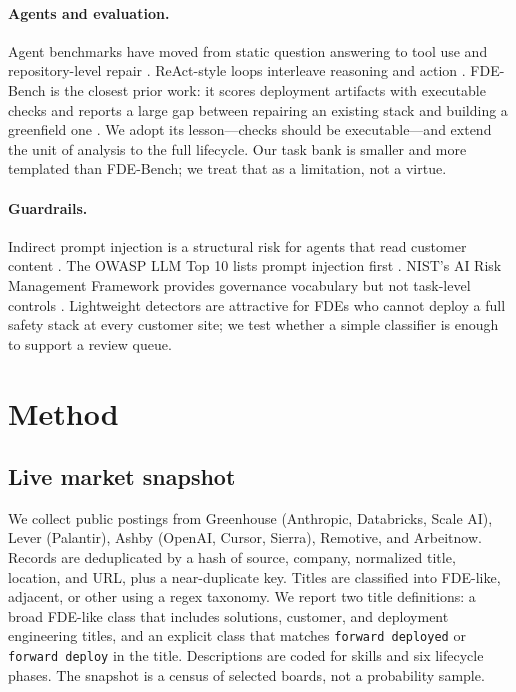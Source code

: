 \documentclass[11pt]{article}
\begin{document}
\paragraph{Agents and evaluation.} Agent benchmarks have moved from static question answering to tool use and repository-level repair \citep{liu2024agentbench,jimenez2024swebench}. ReAct-style loops interleave reasoning and action \citep{yao2023react}. FDE-Bench is the closest prior work: it scores deployment artifacts with executable checks and reports a large gap between repairing an existing stack and building a greenfield one \citep{fdebench2026}. We adopt its lesson---checks should be executable---and extend the unit of analysis to the full lifecycle. Our task bank is smaller and more templated than FDE-Bench; we treat that as a limitation, not a virtue.

\paragraph{Guardrails.} Indirect prompt injection is a structural risk for agents that read customer content \citep{greshake2023injection}. The OWASP LLM Top 10 lists prompt injection first \citep{owasp2025}. NIST's AI Risk Management Framework provides governance vocabulary but not task-level controls \citep{nist2023}. Lightweight detectors are attractive for FDEs who cannot deploy a full safety stack at every customer site; we test whether a simple classifier is enough to support a review queue.

\section{Method}
\subsection{Live market snapshot}
We collect public postings from Greenhouse (Anthropic, Databricks, Scale AI), Lever (Palantir), Ashby (OpenAI, Cursor, Sierra), Remotive, and Arbeitnow. Records are deduplicated by a hash of source, company, normalized title, location, and URL, plus a near-duplicate key. Titles are classified into FDE-like, adjacent, or other using a regex taxonomy. We report two title definitions: a broad FDE-like class that includes solutions, customer, and deployment engineering titles, and an explicit class that matches \texttt{forward deployed} or \texttt{forward deploy} in the title. Descriptions are coded for skills and six lifecycle phases. The snapshot is a census of selected boards, not a probability sample.
\end{document}

